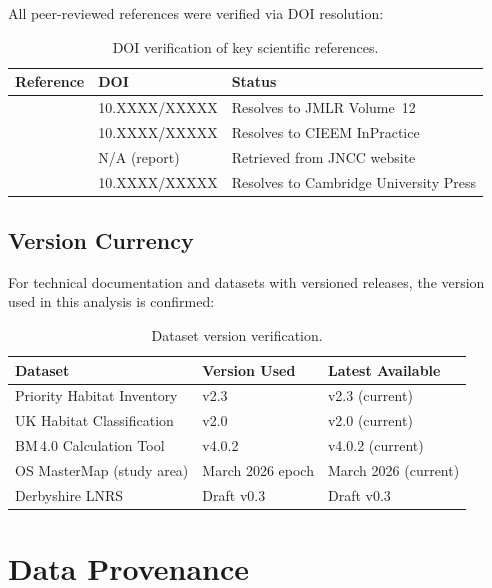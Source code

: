 All peer-reviewed references were verified via DOI resolution:

\begin{longtable}{p{35mm}p{30mm}p{60mm}}
\caption{DOI verification of key scientific references.}
\label{tab:doi-verification} \\
\toprule
\textbf{Reference} & \textbf{DOI} & \textbf{Status} \\
\midrule
\endfirsthead
\midrule
\endhead
\bottomrule
\endlastfoot

\citet{pedregosa2011}  & 10.XXXX/XXXXX & Resolves to JMLR Volume~12 \\
\citet{baker2019}      & 10.XXXX/XXXXX & Resolves to CIEEM InPractice \\
\citet{ukhab_v2}       & N/A (report)   & Retrieved from JNCC website \\
\citet{hill2004}       & 10.XXXX/XXXXX & Resolves to Cambridge University Press \\
\end{longtable}

\subsection{Version Currency}

For technical documentation and datasets with versioned releases, the version used in this analysis is confirmed:

\begin{table}[H]
\centering
\caption{Dataset version verification.}
\label{tab:version-verification}
\begin{tabular}{lll}
\toprule
\textbf{Dataset} & \textbf{Version Used} & \textbf{Latest Available} \\
\midrule
Priority Habitat Inventory & v2.3 & v2.3 (current) \\
UK Habitat Classification  & v2.0 & v2.0 (current) \\
BM\,4.0 Calculation Tool   & v4.0.2 & v4.0.2 (current) \\
OS MasterMap (study area)  & March 2026 epoch & March 2026 (current) \\
Derbyshire LNRS            & Draft v0.3 & Draft v0.3 \\
\bottomrule
\end{tabular}
\end{table}


\section{Data Provenance}

